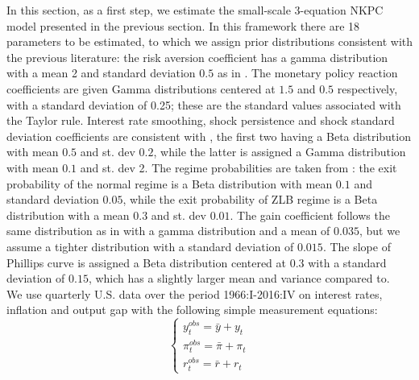 \documentclass[12pt,reqno]{article}
\numberwithin{equation}{section}
\begin{document}
In this section, as a first step, we estimate the small-scale 3-equation NKPC model presented in the previous section. In this framework there are 18 parameters to be estimated, to which we assign prior distributions consistent with the previous literature: the risk aversion coefficient has a gamma distribution with a mean 2 and standard deviation $0.5$ as in \cite{an2007bayesian}. The monetary policy reaction coefficients are given Gamma distributions centered at $1.5$ and $0.5$ respectively, with a standard deviation of 0.25; these are the standard values associated with the Taylor rule. Interest rate smoothing, shock persistence and shock standard deviation coefficients are consistent with \cite{smets2007shocks}, the first two having a Beta distribution with mean $0.5 $ and st. dev $0.2$, while the latter is assigned a Gamma distribution with mean $0.1$ and st. dev 2. The regime probabilities are taken from \cite{linde2017estimation}: the exit probability of the normal regime is a Beta distribution with mean $0.1$ and standard deviation $0.05$, while the exit probability of ZLB regime is a Beta distribution with a mean $0.3$ and st. dev $0.01$. The gain coefficient follows the same distribution as in \cite{slobodyan2012alearning} with a gamma distribution and a mean of $0.035$, but we assume a tighter distribution with a standard deviation of $0.015$. 
The slope of Phillips curve is assigned a Beta distribution centered at $0.3$ with a standard deviation of $0.15$, which has a slightly larger mean and variance compared to\cite{an2007bayesian}.\\

\noindent
We use quarterly U.S. data over the period 1966:I-2016:IV on interest rates, inflation and output gap with the following simple measurement equations: 
$$
\begin{cases}
y_t^{obs}=\bar{y}+y_t \\
\pi_t^{obs}= \bar{\pi} + \pi_t \\
r_t^{obs}=\bar{r}+r_t 
\end{cases}  
$$
\end{document}
